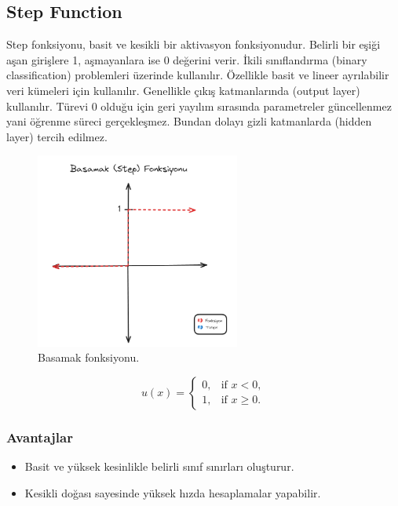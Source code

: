 \newpage

\subsection{Step Function}
Step fonksiyonu, basit ve kesikli bir aktivasyon fonksiyonudur. Belirli bir eşiği aşan girişlere 1, aşmayanlara ise 0 değerini verir. İkili sınıflandırma (binary classification) problemleri üzerinde kullanılır. Özellikle basit ve lineer ayrılabilir veri kümeleri için kullanılır. Genellikle çıkış katmanlarında (output layer) kullanılır. Türevi 0 olduğu için geri yayılım sırasında parametreler güncellenmez yani öğrenme süreci gerçekleşmez. Bundan dolayı gizli katmanlarda (hidden layer) tercih edilmez.

\begin{figure}[h]
    \centering
    \includegraphics[width=0.6\textwidth]{images/step_function.png}
    \caption{Basamak fonksiyonu.}
    \label{fig:enter-label}
\end{figure}

\[u(x) = \begin{cases} 
0, & \text{if } x < 0, \\ 
1, & \text{if } x \geq 0. 
\end{cases}\]

\subsubsection{Avantajlar}
\begin{itemize}
    \item Basit ve yüksek kesinlikle belirli sınıf sınırları oluşturur.
    \item Kesikli doğası sayesinde yüksek hızda hesaplamalar yapabilir. 
\end{itemize}

